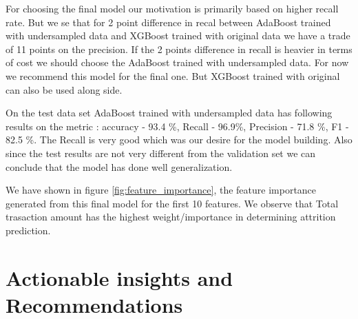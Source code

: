 \documentclass[10pt,a4paper]{style}
\begin{document}
	For choosing the final model our motivation is primarily based on higher recall rate. But we se that for 2 point difference in recal  between AdaBoost trained with undersampled data and XGBoost trained with original data we have a trade of 11 points on the precision. If the 2 points difference in recall is heavier in terms of cost we should choose the AdaBoost trained with undersampled data. For now we recommend this model for the final one. But  XGBoost trained with original can also be used along side.
	
	On the test data set AdaBoost trained with undersampled data has following results on the metric : accuracy - 93.4 \%, Recall - 96.9\%, Precision - 71.8 \%, F1 - 82.5 \%. The Recall is very good which was our desire for the model building. Also since the test results are not very different from the validation set we can conclude that the model has done well generalization.
	
	We have shown in figure \ref{fig:feature_importance}, the feature importance generated from this final model for the first 10 features. We observe that Total trasaction amount has the highest weight/importance in determining attrition prediction.
	
\section{Actionable insights and Recommendations}
\end{document}

